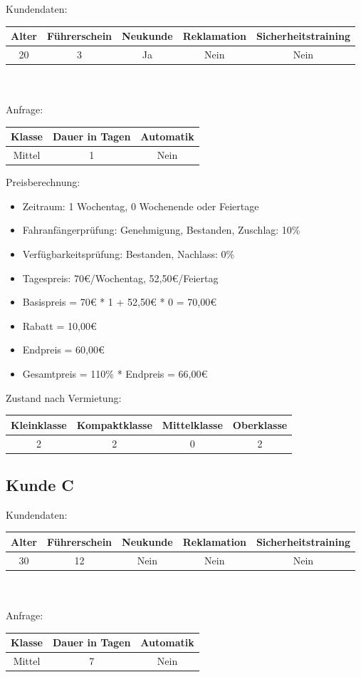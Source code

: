 Kundendaten:\\
\begin{tabular}{|c|c|c|c|c|}
	\hline \textbf{Alter} & \textbf{Führerschein} & \textbf{Neukunde} & \textbf{Reklamation} & \textbf{Sicherheitstraining} \\ 
	\hline 20 & 3 & Ja & Nein & Nein \\ 
	\hline 
\end{tabular} 
\\\\
Anfrage:\\
\begin{tabular}{|c|c|c|}
	\hline \textbf{Klasse} & \textbf{Dauer in Tagen} & \textbf{Automatik} \\ 
	\hline Mittel & 1 & Nein \\ 
	\hline 
\end{tabular}

Preisberechnung:
\begin{itemize}
	\item Zeitraum: 1 Wochentag, 0 Wochenende oder Feiertage
	\item Fahranfängerprüfung: Genehmigung, Bestanden, Zuschlag: 10\%
	\item Verfügbarkeitsprüfung: Bestanden, Nachlass: 0\%
	\item Tagespreis: 70€/Wochentag, 52,50€/Feiertag
	\item Basispreis = 70€ * 1 + 52,50€ * 0 = 70,00€
	\item Rabatt = 10,00€
	\item Endpreis = 60,00€
	\item Gesamtpreis = 110\% * Endpreis = 66,00€
\end{itemize}

Zustand nach Vermietung:\\
\begin{tabular}{|c|c|c|c|}
	\hline \textbf{Kleinklasse} & \textbf{Kompaktklasse} & \textbf{Mittelklasse} & \textbf{Oberklasse}  \\ 
	\hline 2 & 2 & 0 & 2 \\ 
	\hline 
\end{tabular} 

\subsection{Kunde C}

Kundendaten:\\
\begin{tabular}{|c|c|c|c|c|}
	\hline \textbf{Alter} & \textbf{Führerschein} & \textbf{Neukunde} & \textbf{Reklamation} & \textbf{Sicherheitstraining} \\ 
	\hline 30 & 12 & Nein & Nein & Nein \\ 
	\hline 
\end{tabular} 
\\\\
Anfrage:\\
\begin{tabular}{|c|c|c|}
	\hline \textbf{Klasse} & \textbf{Dauer in Tagen} & \textbf{Automatik} \\ 
	\hline Mittel & 7 & Nein \\ 
	\hline 
\end{tabular}

